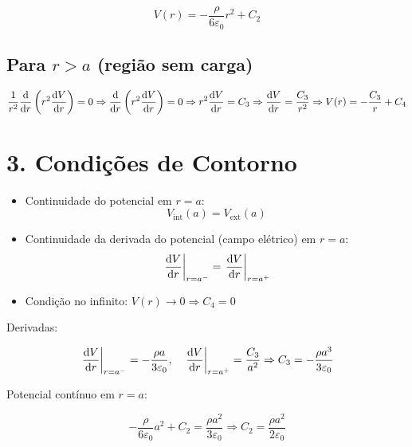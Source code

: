 \documentclass[a4paper,12pt]{article}
\begin{document}
\begin{flushleft}
\begin{equation}
V(r) = -\frac{\rho}{6\varepsilon_0} r^2 + C_2
\end{equation}

\subsection*{Para \( r > a \) (região sem carga)}

\begin{equation}
\frac{1}{r^2} \dv{r} \left( r^2 \dv{V}{r} \right) = 0
\Rightarrow \dv{r} \left( r^2 \dv{V}{r} \right) = 0
\Rightarrow r^2 \dv{V}{r} = C_3
\Rightarrow \dv{V}{r} = \frac{C_3}{r^2}
\Rightarrow V(r) = -\frac{C_3}{r} + C_4
\end{equation}

\section*{3. Condições de Contorno}

\begin{itemize}
    \item Continuidade do potencial em \( r = a \):
    \begin{equation}
    V_{\text{int}}(a) = V_{\text{ext}}(a)
    \end{equation}
    \item Continuidade da derivada do potencial (campo elétrico) em \( r = a \):
    \begin{equation}
    \left. \dv{V}{r} \right|_{r=a^-} = \left. \dv{V}{r} \right|_{r=a^+}
    \end{equation}
    \item Condição no infinito: \( V(r) \rightarrow 0 \Rightarrow C_4 = 0 \)
\end{itemize}

Derivadas:

\begin{equation}
\left. \dv{V}{r} \right|_{r=a^-} = -\frac{\rho a}{3\varepsilon_0}, \quad
\left. \dv{V}{r} \right|_{r=a^+} = \frac{C_3}{a^2}
\Rightarrow C_3 = -\frac{\rho a^3}{3\varepsilon_0}
\end{equation}

Potencial contínuo em \( r = a \):

\begin{equation}
-\frac{\rho}{6\varepsilon_0} a^2 + C_2 = \frac{\rho a^2}{3\varepsilon_0}
\Rightarrow C_2 = \frac{\rho a^2}{2\varepsilon_0}
\end{equation}


\end{flushleft}
\end{document}
